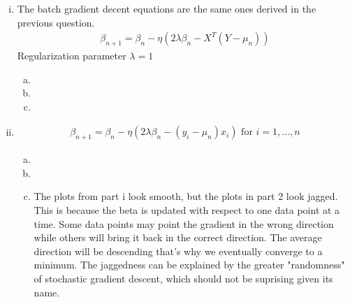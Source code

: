 \documentclass[paper=a4, fontsize=11pt]{scrartcl} %
\numberwithin{equation}{section} %
\numberwithin{figure}{section} %
\numberwithin{table}{section} %
\begin{document}
\begin{enumerate}[(i)]

\item
The batch gradient decent equations are the same ones derived in the previous question.
\begin{align*}
\beta_{n+1} = \beta_n - \eta(2\lambda\beta_n - X^T(Y-\mu_n))
\end{align*}
Regularization parameter $\lambda = 1$
\begin{enumerate}[(a)]
\item
\item
\item

\end{enumerate}

\item
\begin{align*}
\beta_{n+1} = \beta_n - \eta(2\lambda\beta_n - (y_i-\mu_n)x_i) \text{\ \ \ for\ \ } i=1,...,n
\end{align*}
\begin{enumerate}[(a)]
\item
\item
\item

The plots from part i look smooth, but the plots in part 2 look jagged. This is because the beta is updated with respect to one data point at a time. Some data points may point the gradient in the wrong direction while others will bring it back in the correct direction. The average direction will be descending that's why we eventually converge to a minimum. The jaggedness can be explained by the greater "randomness" of stochastic gradient descent, which should not be suprising given its name.
\end{enumerate}


\end{enumerate}
\end{document}
